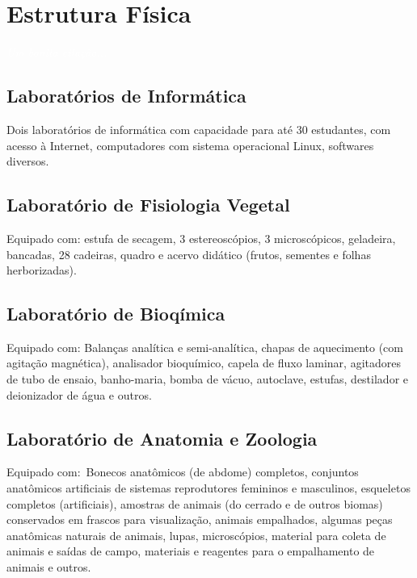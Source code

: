 \documentclass[11pt,fleqn]{book} %
\begin{document}


\chapter{Estrutura Física}\label{estrutura}
\vspace{6em}
\begin{flushright}
	\textit{\textcolor{white}{Um bonita citação...}}
\end{flushright}
\vspace{12em}

\section{Laboratórios de Informática}
Dois laboratórios de informática com capacidade para até 30 estudantes, com acesso à Internet, computadores com sistema operacional Linux, softwares diversos.

\section{Laboratório de Fisiologia Vegetal}
Equipado com: estufa de secagem, 3 estereoscópios, 3 microscópicos, geladeira, bancadas, 28 cadeiras, quadro e acervo didático (frutos, sementes e folhas herborizadas). 

\section{Laboratório de Bioqímica}
Equipado com: Balanças analítica e semi-analítica, chapas de aquecimento (com agitação magnética), analisador bioquímico, capela de fluxo laminar, agitadores de tubo de ensaio, banho-maria, bomba de vácuo, autoclave, estufas, destilador e deionizador de água e outros.

\section{Laboratório de Anatomia e Zoologia}
Equipado com: Bonecos anatômicos (de abdome) completos, conjuntos anatômicos artificiais de sistemas reprodutores femininos e masculinos, esqueletos completos (artificiais), amostras de animais (do cerrado e de outros biomas) conservados em frascos para visualização, animais empalhados, algumas peças anatômicas naturais de animais, lupas, microscópios, material para coleta de animais e saídas de campo, materiais e reagentes para o empalhamento de animais e outros.
\end{document}
